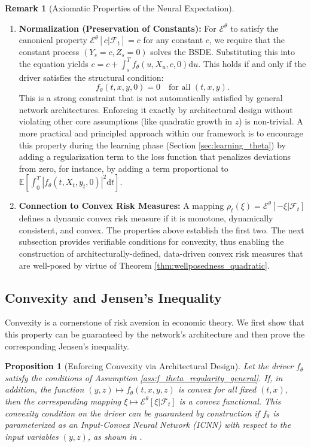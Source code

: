 \documentclass[qian]{imsart}
\newcommand{\E}{\mathbb{E}}
\newcommand{\Fcal}{\mathcal{F}}
\newcommand{\cEneutheta}{\mathcal{E}^{\theta}}
\newcommand{\dd}{\mathrm{d}}
\newcommand{\abs}[1]{\left\lvert#1\right\rvert}
\theoremstyle{plain}
\newtheorem{proposition}[theorem]{Proposition}
\theoremstyle{definition}
\newtheorem{remark}[theorem]{Remark}
\begin{document}
\begin{remark}[Axiomatic Properties of the Neural Expectation]
\begin{enumerate}[label=(\roman*), leftmargin=*]
    \item \textbf{Normalization (Preservation of Constants):} For $\cEneutheta$ to satisfy the canonical property $\cEneutheta[c|\Fcal_t] = c$ for any constant $c$, we require that the constant process $(Y_s = c, Z_s = 0)$ solves the BSDE. Substituting this into the equation yields $c = c + \int_s^T f_\theta(u, X_u, c, 0) \dd u$. This holds if and only if the driver satisfies the structural condition:
    \[ f_\theta(t, x, y, 0) = 0 \quad \text{for all } (t, x, y). \]
    This is a strong constraint that is not automatically satisfied by general network architectures. Enforcing it exactly by architectural design without violating other core assumptions (like quadratic growth in $z$) is non-trivial. A more practical and principled approach within our framework is to encourage this property during the learning phase (Section \ref{sec:learning_theta}) by adding a regularization term to the loss function that penalizes deviations from zero, for instance, by adding a term proportional to $\E[\int_0^T \abs{f_\theta(t, X_t, y_t, 0)}^2 \dd t]$.

    \item \textbf{Connection to Convex Risk Measures:} A mapping $\rho_t(\xi) = \cEneutheta[-\xi | \Fcal_t]$ defines a dynamic convex risk measure if it is monotone, dynamically consistent, and convex. The properties above establish the first two. The next subsection provides verifiable conditions for convexity, thus enabling the construction of architecturally-defined, data-driven convex risk measures that are well-posed by virtue of Theorem \ref{thm:wellposedness_quadratic}.
\end{enumerate}
\end{remark}

\subsection{Convexity and Jensen's Inequality}

Convexity is a cornerstone of risk aversion in economic theory. We first show that this property can be guaranteed by the network's architecture and then prove the corresponding Jensen's inequality.

\begin{proposition}[Enforcing Convexity via Architectural Design]
\label{prop:convexity_enforcement}
Let the driver $f_\theta$ satisfy the conditions of Assumption \ref{ass:f_theta_regularity_general}. If, in addition, the function $(y,z) \mapsto f_\theta(t,x,y,z)$ is convex for all fixed $(t,x)$, then the corresponding mapping $\xi \mapsto \cEneutheta[\xi | \Fcal_t]$ is a convex functional. This convexity condition on the driver can be guaranteed by construction if $f_\theta$ is parameterized as an Input-Convex Neural Network (ICNN) with respect to the input variables $(y,z)$, as shown in \cite{AmosEtAl2017ICNN}.
\end{proposition}
\end{document}
